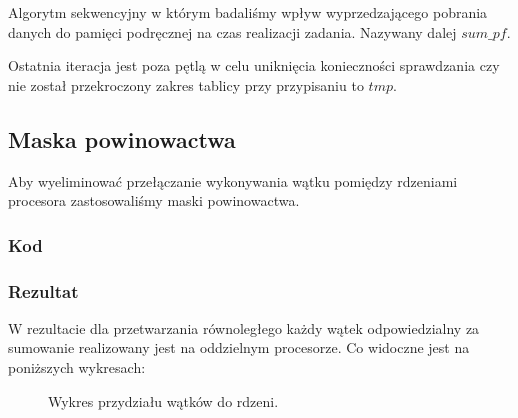 Algorytm sekwencyjny w którym badaliśmy wpływ wyprzedzającego pobrania danych do pamięci podręcznej na czas realizacji zadania. Nazywany dalej $sum\_pf$.


Ostatnia iteracja jest poza pętlą w celu uniknięcia konieczności sprawdzania czy nie został przekroczony zakres tablicy przy przypisaniu to $tmp$.

\subsection{Maska powinowactwa}

Aby wyeliminować przełączanie wykonywania wątku pomiędzy rdzeniami procesora zastosowaliśmy maski powinowactwa.

\subsubsection{Kod}



\subsubsection{Rezultat}

W rezultacie dla przetwarzania równoległego każdy wątek odpowiedzialny za sumowanie realizowany jest na oddzielnym procesorze. Co widoczne jest na poniższych wykresach:

\begin{figure}[Float]
\centering
{}
\qquad
{}
\caption{Wykres przydziału wątków do rdzeni.}
\end{figure}
